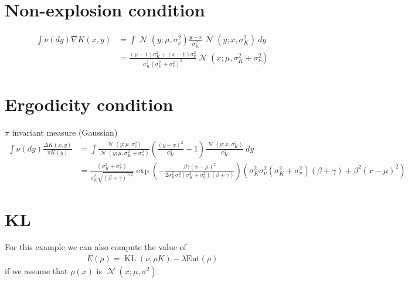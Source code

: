 \documentclass[a4paper]{amsart}
\DeclareMathOperator{\N}{\mathcal{N}}
\DeclareMathOperator{\KL}{KL}
\begin{document}
\section{Non-explosion condition}
\begin{align*}
\int \nu(dy)\nabla K(x, y)&= \int \N(y; \mu, \sigma_{\nu}^2)\frac{y - x}{\sigma_K^2}\N(y; x, \sigma_K^2)\ dy\\
&= \frac{(\mu -1)\sigma_K^2+(x-1)\sigma_\nu^2}{\sigma_K^2(\sigma_K^2 + \sigma_\nu^2)^2}\N(x; \mu, \sigma_K^2+\sigma_\nu^2)
\end{align*}

\section{Ergodicity condition}
$\pi$ invariant measure (Gaussian)
\begin{align*}
\int \nu(dy)\frac{\Delta K(x, y)}{ \pi K(y)}&= \int \frac{\N(y; \mu, \sigma_{\nu}^2)}{\N(y; \mu, \sigma_K^2 + \sigma_\pi^2)}\left(\frac{(y - x)^2}{\sigma_K^2}-1\right)\frac{\N(y; x, \sigma_K^2)}{\sigma_K^2}\ dy\\
&=  \frac{(\sigma_K^2 + \sigma_\pi^2)}{\sigma_K^2\sqrt{(\beta + \gamma)^{3/2}}}\exp\left(- \frac{\beta\gamma\left(x-\mu\right)^2}{2\sigma_K^2\sigma_{\nu}^2(\sigma_K^2 + \sigma_0^2)(\beta + \gamma)}\right)\left( \sigma_K^2\sigma_\nu^2(\sigma_K^2+\sigma_\pi^2)(\beta+\gamma)+\beta^2(x-\mu)^2\right)
\end{align*}

\section{KL}
For this example we can also compute the value of
\begin{align*}
E(\rho) = \KL(\nu, \rho K) - \lambda \text{Ent}(\rho)
\end{align*}
if we assume that $\rho(x)$ is $\N(x; \mu, \sigma^2)$.
\end{document}
